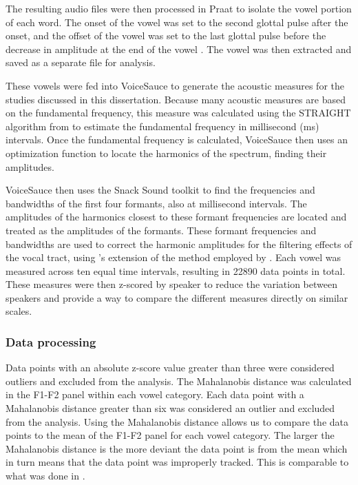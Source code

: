 The resulting audio files were then processed in Praat to isolate the vowel portion of each word. The onset of the vowel was set to the second glottal pulse after the onset, and the offset of the vowel was set to the last glottal pulse before the decrease in amplitude at the end of the vowel \citep{garellekAcousticDiscriminabilityComplex2020}. The vowel was then extracted and saved as a separate file for analysis.

These vowels were fed into VoiceSauce \citep{shueVoiceSauceProgramVoice2011} to generate the acoustic measures for the studies discussed in this dissertation. Because many acoustic measures are based on the fundamental frequency, this measure was calculated using the STRAIGHT algorithm from \citep{kawaharaInstantaneousfrequencybasedPitchExtraction1998} to estimate the fundamental frequency in millisecond (ms) intervals. Once the fundamental frequency is calculated, VoiceSauce then uses an optimization function to locate the harmonics of the spectrum, finding their amplitudes.

VoiceSauce then uses the Snack Sound toolkit \citep{sjolanderSnackSoundToolkit2004} to find the frequencies and bandwidths of the first four formants, also at millisecond intervals. The amplitudes of the harmonics closest to these formant frequencies are located and treated as the amplitudes of the formants. These formant frequencies and bandwidths are used to correct the harmonic amplitudes for the filtering effects of the vocal tract, using \citeauthor{iseliAgeSexVowel2007}'s \citeyear{iseliAgeSexVowel2007} extension of the method employed by \citet{hansonGlottalCharacteristicsFemale1997}. Each vowel was measured across ten equal time intervals, resulting in 22890 data points in total. These measures were then z-scored by speaker to reduce the variation between speakers and provide a way to compare the different measures directly on similar scales.

\subsubsection{Data processing} \label{sec:data_processing}
Data points with an absolute z-score value greater than three were considered outliers and excluded from the analysis. The Mahalanobis distance was calculated in the F1-F2 panel within each vowel category. Each data point with a Mahalanobis distance greater than six was considered an outlier and excluded from the analysis. Using the Mahalanobis distance allows us to compare the data points to the mean of the F1-F2 panel for each vowel category. The larger the Mahalanobis distance is the more deviant the data point is from the mean which in turn means that the data point was improperly tracked. This is comparable to what was done in \citet{seyfarthPlosiveVoicingAcoustics2018,chaiCheckedSyllablesChecked2022,garellekPhoneticsWhiteHmong2023}.

